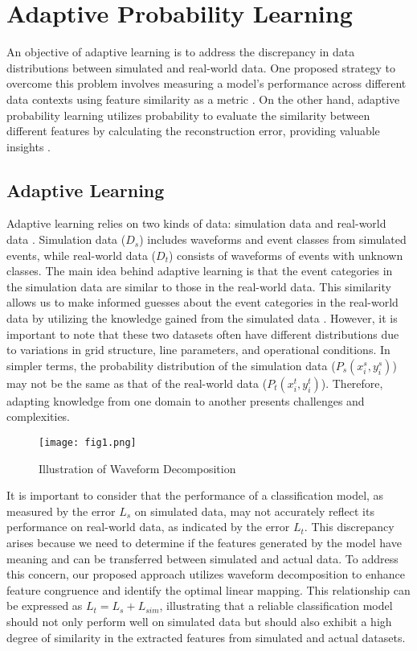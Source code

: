 \documentclass[conference]{IEEEtran}
\begin{document}
\section{Adaptive Probability Learning}

An objective of adaptive learning is to address the discrepancy in data distributions between simulated and real-world data. One proposed strategy to overcome this problem involves measuring a model's performance across different data contexts using feature similarity as a metric \cite{liang2020novel}\cite{liu2019prediction}. On the other hand, adaptive probability learning utilizes probability to evaluate the similarity between different features by calculating the reconstruction error, providing valuable insights \cite{haeusser2017associative}\cite{xiong2020incipient}\cite{wu2020harmonic}.

\subsection{Adaptive Learning}

Adaptive learning relies on two kinds of data: simulation data and real-world data \cite{wang2020power}. Simulation data ($D_{s}$) includes waveforms and event classes from simulated events, while real-world data ($D_{t}$) consists of waveforms of events with unknown classes. The main idea behind adaptive learning is that the event categories in the simulation data are similar to those in the real-world data. This similarity allows us to make informed guesses about the event categories in the real-world data by utilizing the knowledge gained from the simulated data \cite{liu2022method}. However, it is important to note that these two datasets often have different distributions due to variations in grid structure, line parameters, and operational conditions. In simpler terms, the probability distribution of the simulation data ($P_{s}\left(x_{i}^{s}, y_{i}^{s}\right)$) may not be the same as that of the real-world data ($P_{t}\left(x_{i}^{t}, y_{i}^{t}\right)$). Therefore, adapting knowledge from one domain to another presents challenges and complexities.

\begin{figure}[htbp]
\centerline{\texttt{[image: fig1.png]}}
\caption{Illustration of Waveform Decomposition}
\label{fig}
\end{figure}



It is important to consider that the performance of a classification model, as measured by the error $L_s$ on simulated data, may not accurately reflect its performance on real-world data, as indicated by the error $L_t$. This discrepancy arises because we need to determine if the features generated by the model have meaning and can be transferred between simulated and actual data. To address this concern, our proposed approach utilizes waveform decomposition to enhance feature congruence and identify the optimal linear mapping. This relationship can be expressed as $L_t = L_s + L_{sim}$, illustrating that a reliable classification model should not only perform well on simulated data but should also exhibit a high degree of similarity in the extracted features from simulated and actual datasets.
\end{document}
